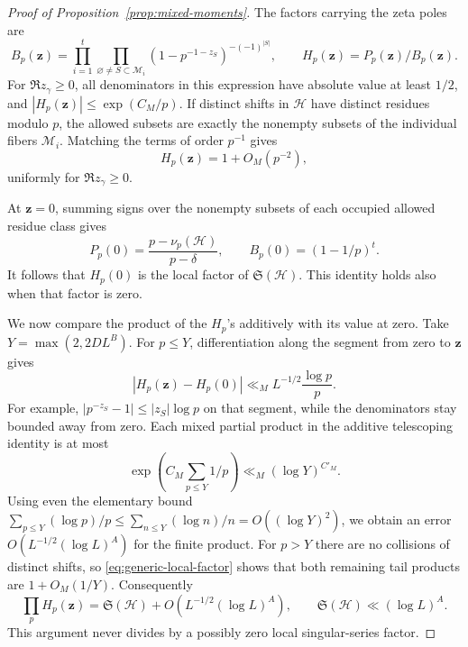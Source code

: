\begin{proof}[Proof of Proposition~\ref{prop:mixed-moments}]
The factors carrying the zeta poles are
\[
 B_p(\mathbf z)=\prod_{i=1}^t\prod_{\varnothing\ne S\subset\mathcal M_i}
 (1-p^{-1-z_S})^{-(-1)^{|S|}},\qquad
 H_p(\mathbf z)=P_p(\mathbf z)/B_p(\mathbf z).
\]
For $\Re z_\gamma\ge0$, all denominators in this expression have absolute
value at least $1/2$, and $|H_p(\mathbf z)|\le\exp(C_M/p)$. If distinct shifts
in $\mathcal H$ have distinct residues modulo $p$, the allowed subsets are
exactly the nonempty subsets of the individual fibers $\mathcal M_i$.
Matching the terms of order $p^{-1}$ gives
\begin{equation}\label{eq:generic-local-factor}
 H_p(\mathbf z)=1+O_M(p^{-2}),
\end{equation}
uniformly for $\Re z_\gamma\ge0$.

At $\mathbf z=0$, summing signs over the nonempty subsets of each occupied
allowed residue class gives
\[
 P_p(0)=\frac{p-\nu_p(\mathcal H)}{p-\delta},\qquad
 B_p(0)=(1-1/p)^t.
\]
It follows that $H_p(0)$ is the local factor of $\mathfrak S(\mathcal H)$.
This identity holds also when that factor is zero.

We now compare the product of the $H_p$'s additively with its value at zero.
Take $Y=\max(2,2DL^B)$. For $p\le Y$, differentiation along the segment from
zero to $\mathbf z$ gives
\[
 |H_p(\mathbf z)-H_p(0)|\ll_M L^{-1/2}\frac{\log p}{p}.
\]
For example, $|p^{-z_S}-1|\le|z_S|\log p$ on that segment, while the denominators
stay bounded away from zero. Each mixed partial product in the additive
telescoping identity is at most
\[
 \exp\left(C_M\sum_{p\le Y}1/p\right)\ll_M(\log Y)^{C'_M}.
\]
Using even the elementary bound
$\sum_{p\le Y}(\log p)/p\le\sum_{n\le Y}(\log n)/n=O((\log Y)^2)$, we obtain
an error $O(L^{-1/2}(\log L)^A)$ for the finite product. For $p>Y$ there are
no collisions of distinct shifts, so \eqref{eq:generic-local-factor} shows
that both remaining tail products are $1+O_M(1/Y)$. Consequently
\begin{equation}\label{eq:zero-safe-comparison}
 \prod_pH_p(\mathbf z)=\mathfrak S(\mathcal H)
  +O\!\left(L^{-1/2}(\log L)^A\right),\qquad
 \mathfrak S(\mathcal H)\ll(\log L)^A.
\end{equation}
This argument never divides by a possibly zero local singular-series factor.


\end{proof}

